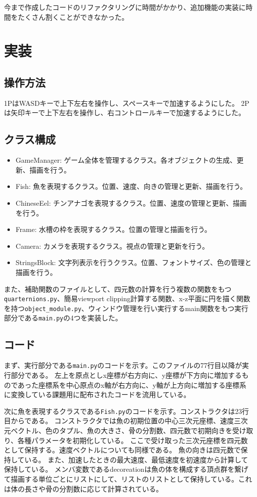 \documentclass[uplatex,dvipdfmx]{jsarticle}
\begin{document}
今まで作成したコードのリファクタリングに時間がかかり、追加機能の実装に時間をたくさん割くことができなかった。
\section{実装}
\subsection{操作方法}
1PはWASDキーで上下左右を操作し、スペースキーで加速するようにした。
2Pは矢印キーで上下左右を操作し、右コントロールキーで加速するようにした。
\subsection{クラス構成}
\begin{itemize}
\item GameManager: ゲーム全体を管理するクラス。各オブジェクトの生成、更新、描画を行う。
\item Fish: 魚を表現するクラス。位置、速度、向きの管理と更新、描画を行う。
\item ChineseEel: チンアナゴを表現するクラス。位置、速度の管理と更新、描画を行う。
\item Frame: 水槽の枠を表現するクラス。位置の管理と描画を行う。
\item Camera: カメラを表現するクラス。視点の管理と更新を行う。
\item StringsBlock: 文字列表示を行うクラス。位置、フォントサイズ、色の管理と描画を行う。
\end{itemize}
また、補助関数のファイルとして、四元数の計算を行う複数の関数をもつ\verb|quarternions.py|、簡易viewport clipping計算する関数、x-z平面に円を描く関数を持つ\verb|object_module.py|、ウィンドウ管理を行い実行するmain関数をもつ実行部分である\verb|main.py|の4つを実装した。

\subsection{コード}
まず、実行部分である\verb|main.py|のコードを示す。このファイルの77行目以降が実行部分である。
左上を原点としx座標が右方向に、y座標が下方向に増加するものであった座標系を中心原点のx軸が右方向に、y軸が上方向に増加する座標系に変換している課題用に配布されたコードを流用している。


次に魚を表現するクラスである\verb|Fish.py|のコードを示す。コンストラクタは23行目からである。
コンストラクタでは魚の初期位置の中心三次元座標、速度三次元ベクトル、色のタプル、魚の大きさ、骨の分割数、四元数で初期向きを受け取り、各種パラメータを初期化している。
ここで受け取った三次元座標を四元数として保持する。速度ベクトルについても同様である。 魚の向きは四元数で保持している。
また、加速したときの最大速度、最低速度を初速度から計算して保持している。
メンバ変数であるdecoreationは魚の体を構成する頂点群を繋げて描画する単位ごとにリストにして、リストのリストとして保持している。これは体の長さや骨の分割数に応じて計算されている。
\end{document}
